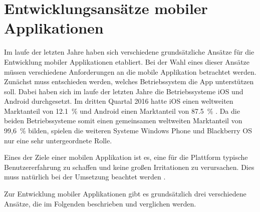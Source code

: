 \chapter{Entwicklungsansätze mobiler Applikationen}
\label{chap:entwicklungsansaetze}
%
%
Im laufe der letzten Jahre haben sich verschiedene grundsätzliche Ansätze für die Entwicklung mobiler Applikationen etabliert. Bei der Wahl eines dieser Ansätze müssen verschiedene Anforderungen an die mobile Applikation betrachtet werden. Zunächst muss entschieden werden, welches Betriebssystem die App unterstützen soll. Dabei haben sich im laufe der letzten Jahre die Betriebssysteme iOS und Android durchgesetzt. Im dritten Quartal 2016 hatte iOS einen weltweiten Marktanteil von 12.1~\% und Android einen Marktanteil von 87.5~\% \cite{strategyAnalyticsMarktanteile}. Da die beiden Betriebssysteme somit einen gemeinsamen weltweiten Marktanteil von 99,6~\%  bilden, spielen die weiteren Systeme Windows Phone und Blackberry OS nur eine sehr untergeordnete Rolle.

Eines der Ziele einer mobilen Applikation ist es, eine für die Plattform typische Benutzererfahrung zu schaffen und keine großen Irritationen zu verursachen. Dies muss natürlich bei der Umsetzung beachtet werden \cite{FrancisHybridApp}.

Zur Entwicklung mobiler Applikationen gibt es grundsätzlich drei verschiedene Ansätze, die im Folgenden beschrieben und verglichen werden.
\begin{comment}
    
    Zur Entwicklung mobiler Applikationen gibt es grundsätzlich drei verschiedene Ansätze, die sich folgendermaßen charakterisieren lassen:
    \begin{itemize}
        \item Native Entwicklung der Applikation in der Programmiersprache, die ursprünglich für die Entwicklung auf dieser Plattform vorgesehen war
        \item Systemübergreifende Entwicklung mittels einer Web-Applikation
        \item Systemübergreifende Entwicklung mittels hybrider Frameworks
    \end{itemize}

\end{comment}
%
%
